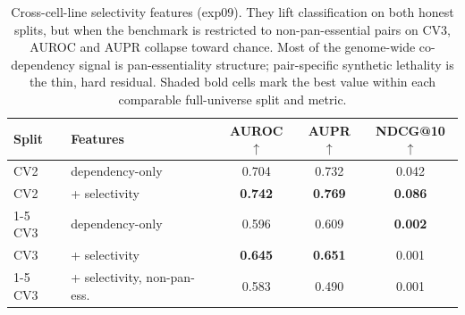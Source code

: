 \begin{table}[!htbp]
  \centering
  \caption{Cross-cell-line selectivity features (exp09). They lift classification on both honest splits, but when the benchmark is restricted to non-pan-essential pairs on CV3, AUROC and AUPR collapse toward chance. Most of the genome-wide co-dependency signal is pan-essentiality structure; pair-specific synthetic lethality is the thin, hard residual. Shaded bold cells mark the best value within each comparable full-universe split and metric.}
  \label{tab:decomposition}
  \begin{tabular}{llccc}
    \toprule
    Split & Features & AUROC$\uparrow$ & AUPR$\uparrow$ & NDCG@10$\uparrow$ \\
    \midrule
    CV2 & dependency-only & 0.704 & 0.732 & 0.042 \\
    CV2 & + selectivity & \cellcolor{hl}\textbf{0.742} & \cellcolor{hl}\textbf{0.769} & \cellcolor{hl}\textbf{0.086} \\
    \cmidrule(lr){1-5}
    CV3 & dependency-only & 0.596 & 0.609 & \cellcolor{hl}\textbf{0.002} \\
    CV3 & + selectivity & \cellcolor{hl}\textbf{0.645} & \cellcolor{hl}\textbf{0.651} & 0.001 \\
    \cmidrule(lr){1-5}
    CV3 & + selectivity, non-pan-ess. & 0.583 & 0.490 & 0.001 \\
    \bottomrule
  \end{tabular}
\end{table}
